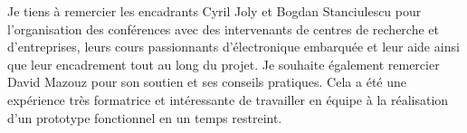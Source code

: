 \begin{titlepage}
        \begin{remerciements}
            Je tiens à remercier les encadrants Cyril Joly et Bogdan Stanciulescu pour 
             l'organisation des conférences avec des intervenants de centres de recherche et d'entreprises,
             leurs cours passionnants d'électronique embarquée
             et leur aide ainsi que leur encadrement tout au long du projet.
            Je souhaite également remercier David Mazouz pour son soutien et ses conseils pratiques.
            Cela a été une expérience très formatrice et intéressante de travailler en équipe à la réalisation d'un prototype
             fonctionnel en un temps restreint.
        \end{remerciements}
    
    

    \end{titlepage}


    \makeatother